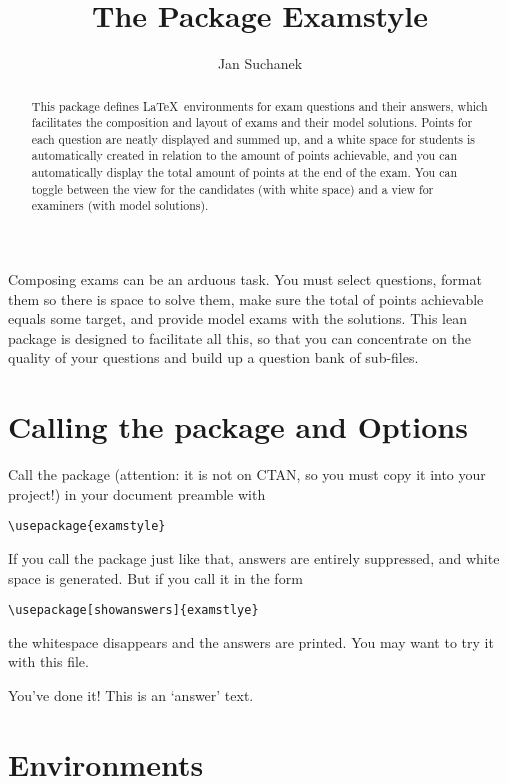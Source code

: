 \documentclass[a4paper]{scrartcl}
\title{The Package Examstyle}
\subtitle{\begin{answer-}...in answer mode\end{answer-}}
\author{Jan Suchanek}
\begin{document}
\maketitle


\pagealert

\begin{abstract}
This package defines \LaTeX\ environments for exam questions and their answers, which facilitates the composition and layout of exams and their model solutions. Points for each question are neatly displayed and summed up, and a white space for students is automatically created in relation to the amount of points achievable, and you can automatically display the total amount of points at the end of the exam. You can toggle between the view for the candidates  (with white space) and a view for examiners (with model solutions). 
\end{abstract}



Composing exams can be an arduous task. You must select questions, format them so there is space to solve them, make sure the total of points achievable equals some target, and provide model  exams with the solutions. This lean package is designed to facilitate all this, so that you can concentrate on the quality of your questions and build up a question bank of sub-files.

\noindent
\section*{Calling the package and Options}
Call the package (attention: it is not on CTAN, so you must copy it into your project!) in your document preamble with
\begin{verbatim}
\usepackage{examstyle}
\end{verbatim}
 If you call the package just like that, answers are entirely suppressed, and white space is generated. But if you call it in the form
\begin{verbatim}
\usepackage[showanswers]{examstlye}
\end{verbatim}
the whitespace disappears and the answers are printed.  You may want to try it with this file. 


\begin{answer}
You've done it! This is an `answer' text.
\end{answer}

\noindent
\section*{Environments}
\end{document}
